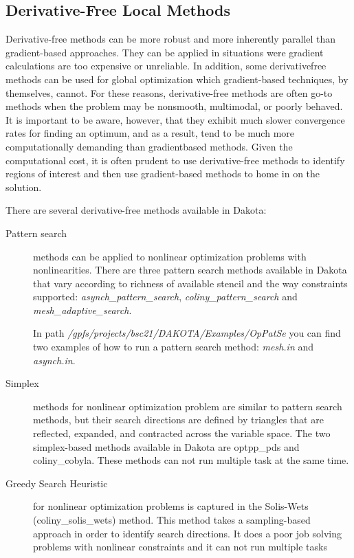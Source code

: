 \documentclass[12pt,a4paper,article]{memoir}
\begin{document}
\subsection{Derivative-Free Local Methods}

Derivative-free methods can be more robust and more inherently parallel than gradient-based approaches. They can be applied in situations were gradient calculations are too expensive or unreliable. In addition, some derivativefree methods can be used for global optimization which gradient-based techniques, by themselves, cannot. For these reasons, derivative-free methods are often go-to methods when the problem may be nonsmooth, multimodal, or poorly behaved. It is important to be aware, however, that they exhibit much slower convergence rates for finding an optimum, and as a result, tend to be much more computationally demanding than gradientbased methods. Given the computational cost, it is often prudent to use derivative-free methods to identify regions of interest and then use gradient-based methods to home in on the solution.

There are several derivative-free methods available in Dakota:

\begin{description}
\item[Pattern search] methods can be applied to nonlinear optimization problems with nonlinearities. There are three  pattern search methods available in Dakota that vary according to richness of available stencil and the way constraints supported: \textit{asynch\_pattern\_search}, \textit{coliny\_pattern\_search} and \textit{mesh\_adaptive\_search}.

In path \textit{/gpfs/projects/bsc21/DAKOTA/Examples/OpPatSe} you can find two examples of how to run a pattern search method: \textit{mesh.in} and \textit{asynch.in}.

\item[Simplex] methods for nonlinear optimization problem are similar to pattern search methods, but their search directions are defined by triangles that are reflected, expanded, and contracted across the variable space. The two simplex-based methods available in Dakota are optpp\_pds and coliny\_cobyla. These methods can not run multiple task at the same time.

\item[Greedy Search Heuristic] for nonlinear optimization problems is captured in the Solis-Wets (coliny\_solis\_wets) method. This method takes a sampling-based approach in order to identify search directions. It does a poor job solving problems with nonlinear constraints and it can not run multiple tasks
\end{description}
\end{document}

